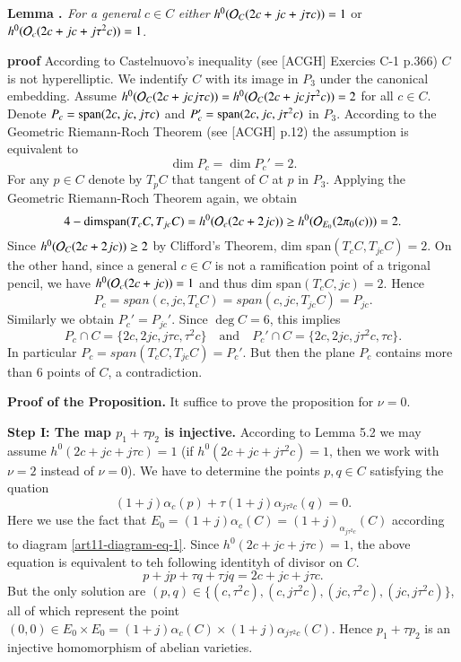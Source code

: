 \medskip
\noindent
{\bfseries {} Lemma . \label{art11-lemma-5.2}} \textit{For a general} $c\in C$ \textit{either} $h^{0}(\mathcal{O}_{C}(2c + jc +j \tau c)) =1$ or $h^{0}(\mathcal{O}_{c}(2c +jc +j\tau^{2}c))=1$.

\medskip
\noindent
{\bfseries proof} According to Castelnuovo's inequality (see [ACGH] Exercies C-1 p.366) $C$ is not hyperelliptic. We indentify $C$ with its image in $P_{3}$ under the canonical embedding. Assume $h^{0}(\mathcal{O}_{C}(2c +jc j\tau c)) = h^{0}(\mathcal{O}_{C}(2c +jc j\tau^{2} c)) =2$ for all $c \in C$. Denote $P_{c}={\rm span}(2c,jc, j\tau c)$ and $P_{c}'={\rm span}(2c, jc, j\tau^{2}c)$ in $P_{3}$. According to the Geometric Riemann-Roch Theorem (see [ACGH] p.12) the assumption is equivalent to
$$
\dim P_{c} =\dim P_{c}' =2.
$$ 
For any $p \in C$ denote by $T_{p}C$ that tangent of $C$ at $p$ in $P_{3}$. Applying the Geometric Riemann-Roch Theorem again, we obtain
$$
4-{\rm dim span} (T_{c}C, T_{jc}C)=h^{0}(\mathcal{O}_{c}(2c +2jc))\geq h^{0}(\mathcal{O}_{E_{0}}(2\pi_{0}(c)))=2.
$$
Since $h^{0}(\mathcal{O}_{C}(2c +2jc))\geq 2 $ by Clifford's Theorem, dim span$(T_{c}C, T_{jc}C) = 2$. On the other hand, since a general $c\in C$ is not a ramification point of a trigonal pencil, we have $h^{0}(\mathcal{O}_{c}(2c + jc))=1$ and thus dim span$(T_{c}C, jc)=2$. Hence
$$
P_{c} = span(c, jc, T_{c}C)= span(c, jc,T_{jc}C)=P_{jc}.
$$
Similarly we obtain $P_{c}'=P_{jc}'$. Since $\deg C =6$, this implies
$$
P_{c}\cap C= \{2c,2jc, j\tau c, \tau^{2}c\} \quad \text{and} \quad P_{c}'\cap C = \{2c, 2jc,j\tau^{2}c, \tau c\}.
$$
In particular $P_{c}= span (T_{c}C, T_{jc}C)= P_{c}'$. But then the plane $P_{c}$ contains more than 6 points of $C$, a contradiction.

\medskip
\noindent
{\bfseries Proof of the Proposition.} It suffice  to prove the proposition for $\nu =0$.

\medskip
\noindent
{\bfseries Step I: The map $p_{1} + \tau p_{2}$ is injective.} According to Lemma 5.2 we may assume $h^{0}(2c +jc +j \tau c) =1$ (if $h^{0}(2c + jc +j\tau^{2}c)=1$, then we work with $\nu=2$ instead of $\nu =0$). We have to determine the points $p,q\in C$ satisfying the quation
$$
(1 +j)\alpha_{c}(p) + \tau(1+j)\alpha_{j\tau^{2}c}(q)=0.
$$
Here we use the fact that $ E_{0}=(1 +j)\alpha_{c}(C)=(1+j)_{\alpha_{j\tau^{2}c}}(C)$ according to diagram \eqref{art11-diagram-eq-1}. Since $h^{0}(2c +jc +j\tau c)=1$, the above equation is equivalent to teh following identityh of divisor on $C$.
$$
p +jp + \tau q + \tau jq =2c +jc  +j\tau c.
$$
But the only solution are $(p,q) \in \{(c,\tau^{2}c), (c, j\tau^{2}c), (jc,\tau^{2}c),(jc,j\tau^{2}c)\}$, all of which represent the point $(0,0) \in E_{0} \times E_{0} =(1 +j)\alpha_{c}(C)\times (1 +j)\alpha_{j\tau^{2}c}(C)$.
Hence $p_{1} +\tau p_{2}$ is an injective homomorphism of abelian varieties.

